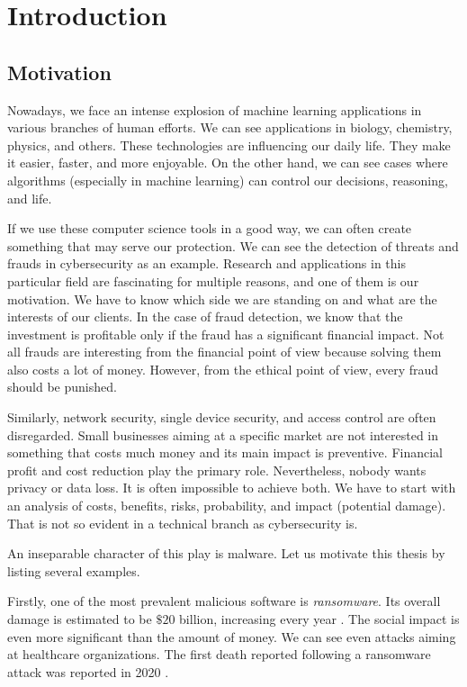 \chapter{Introduction} \label{chap:intro}
\section*{Motivation}
Nowadays, we face an intense explosion of machine learning applications in various branches of human efforts. We can see applications in biology, chemistry, physics, and others. These technologies are influencing our daily life. They make it easier, faster, and more enjoyable. On the other hand, we can see cases where algorithms (especially in machine learning) can control our decisions, reasoning, and life.

If we use these computer science tools in a good way, we can often create something that may serve our protection. We can see the detection of threats and frauds in cybersecurity as an example. Research and applications in this particular field are fascinating for multiple reasons, and one of them is our motivation. We have to know which side we are standing on and what are the interests of our clients.  In the case of fraud detection, we know that the investment is profitable only if the fraud has a significant financial impact. Not all frauds are interesting from the financial point of view because solving them also costs a lot of money. However, from the ethical point of view, every fraud should be punished. 

Similarly, network security, single device security, and access control are often disregarded. Small businesses aiming at a specific market are not interested in something that costs much money and its main impact is preventive. Financial profit and cost reduction play the primary role. Nevertheless, nobody wants privacy or data loss. It is often impossible to achieve both. We have to start with an analysis of costs, benefits, risks, probability, and impact (potential damage). That is not so evident in a technical branch as cybersecurity is.

An inseparable character of this play is malware. Let us motivate this thesis by listing several examples.

Firstly, one of the most prevalent malicious software is \emph{ransomware}. Its overall damage is estimated to be $\$20$ billion, increasing every year \cite{purplesec2021}. The social impact is even more significant than the amount of money. We can see even attacks aiming at healthcare organizations. The first death reported following a ransomware attack was reported in 2020 \cite{Cimpanu2020}.

